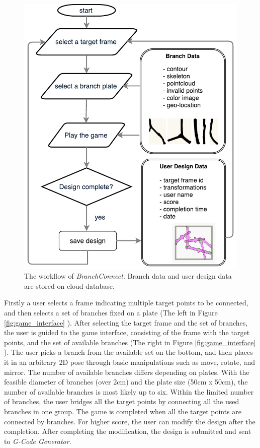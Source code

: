 \begin{figure}[ht]
  \begin{center}
    \includegraphics[width = 0.25\paperwidth]{images/system/systemFlowChart.pdf}
    \caption{The workflow of \textit{BranchConnect}. Branch data and user design data are stored on cloud database.}
    \label{fig:game_flowchart}
  \end{center}
\end{figure}

Firstly a user selects a frame indicating multiple target points to be connected, and then selects a set of branches fixed on a plate (The left in Figure \ref{fig:game_interface} ).
After selecting the target frame and the set of branches, the user is guided to the game interface, consisting of the frame with the target points, and the set of available branches (The right in Figure \ref{fig:game_interface} ).
The user picks a branch from the available set on the bottom, and then places it in an arbitrary 2D pose through basic manipulations such as move, rotate, and mirror.
The number of available branches differs depending on plates.
With the feasible diameter of branches (over 2cm) and the plate size (50cm x 50cm), the number of available branches is most likely up to six.
Within the limited number of branches, the user bridges all the target points by connecting all the used branches in one group.
The game is completed when all the target points are connected by branches.
For higher score, the user can modify the design after the completion.
After completing the modification, the design is submitted and sent to \textit{G-Code Generator}.


